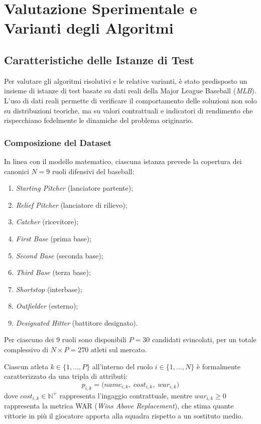\section{Valutazione Sperimentale e Varianti degli Algoritmi}

\subsection{Caratteristiche delle Istanze di Test}
Per valutare gli algoritmi risolutivi e le relative varianti, è stato predisposto un insieme di istanze di test basate su dati reali della Major League Baseball (\textit{MLB}). L'uso di dati reali permette di verificare il comportamento delle soluzioni non solo su distribuzioni teoriche, ma su valori contrattuali e indicatori di rendimento che rispecchiano fedelmente le dinamiche del problema originario.

\subsubsection{Composizione del Dataset}
In linea con il modello matematico, ciascuna istanza prevede la copertura dei canonici $N = 9$ ruoli difensivi del baseball:
\begin{enumerate}
	\item \textit{Starting Pitcher} (lanciatore partente);
	\item \textit{Relief Pitcher} (lanciatore di rilievo);
	\item \textit{Catcher} (ricevitore);
	\item \textit{First Base} (prima base);
	\item \textit{Second Base} (seconda base);
	\item \textit{Third Base} (terza base);
	\item \textit{Shortstop} (interbase);
	\item \textit{Outfielder} (esterno);
	\item \textit{Designated Hitter} (battitore designato).
\end{enumerate}
Per ciascuno dei 9 ruoli sono disponibili $P = 30$ candidati svincolati, per un totale complessivo di $N \times P = 270$ atleti sul mercato.

Ciascun atleta $k \in \{1, \dots, P\}$ all'interno del ruolo $i \in \{1, \dots, N\}$ è formalmente caratterizzato da una tripla di attributi:
\begin{equation}
	p_{i, k} = \big( \mathit{name}_{i, k}, \; \mathit{cost}_{i, k}, \; \mathit{war}_{i, k} \big)
\end{equation}
dove $\mathit{cost}_{i, k} \in \mathbb{N}^+$ rappresenta l'ingaggio contrattuale, mentre $\mathit{war}_{i, k} \ge 0$ rappresenta la metrica WAR (\textit{Wins Above Replacement}), che stima quante vittorie in più il giocatore apporta alla squadra rispetto a un sostituto medio.

